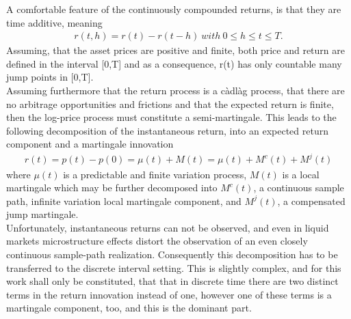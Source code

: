 A comfortable feature of the continuously compounded returns, is that they are time additive, meaning
\begin{align*}
r(t,h) = r(t) - r(t-h) \ with \ 0 \leq h \leq t \leq T.
\end{align*}
Assuming, that the asset prices are positive and finite, both price and return are defined in the interval [0,T] and as a consequence, r(t) has only countable many jump points in [0,T]. \\
Assuming furthermore that the return process is a càdlàg process, that there are no arbitrage opportunities and frictions and  that the expected return is finite, then the log-price process must constitute a semi-martingale. This leads to the following decomposition of the instantaneous return, into an expected return component and a martingale innovation
\begin{align*}
r(t) = p(t) - p(0) = \mu(t) + M(t) = \mu(t) + M^{c}(t) + M^{j}(t)
\end{align*}
where $\mu(t)$ is a predictable and finite variation process, $M(t)$ is a local martingale which may be further decomposed into $M^{c}(t)$, a continuous sample path, infinite variation local martingale component, and $M^{j}(t)$, a compensated jump martingale.\\
Unfortunately, instantaneous returns can not be observed, and even in liquid markets microstructure effects distort the observation of an even closely continuous sample-path realization. Consequently this decomposition has to be transferred to the discrete interval setting. This is slightly complex, and for this work shall only be constituted, that that in discrete time there are two distinct terms in the return innovation instead of one, however one of these terms is a martingale component, too, and this is the dominant part. 